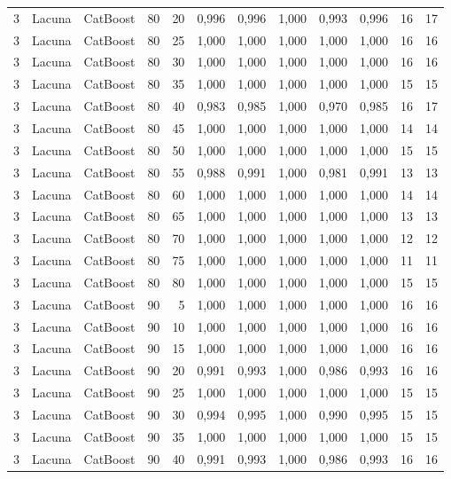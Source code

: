 \begin{longtable}{@{}rllrrrrrrrrr@{}}
3 & Lacuna & CatBoost & 80 & 20 & 0,996 & 0,996 & 1,000 & 0,993 & 0,996 & 16 & 17 \\
3 & Lacuna & CatBoost & 80 & 25 & 1,000 & 1,000 & 1,000 & 1,000 & 1,000 & 16 & 16 \\
3 & Lacuna & CatBoost & 80 & 30 & 1,000 & 1,000 & 1,000 & 1,000 & 1,000 & 16 & 16 \\
3 & Lacuna & CatBoost & 80 & 35 & 1,000 & 1,000 & 1,000 & 1,000 & 1,000 & 15 & 15 \\
3 & Lacuna & CatBoost & 80 & 40 & 0,983 & 0,985 & 1,000 & 0,970 & 0,985 & 16 & 17 \\
3 & Lacuna & CatBoost & 80 & 45 & 1,000 & 1,000 & 1,000 & 1,000 & 1,000 & 14 & 14 \\
3 & Lacuna & CatBoost & 80 & 50 & 1,000 & 1,000 & 1,000 & 1,000 & 1,000 & 15 & 15 \\
3 & Lacuna & CatBoost & 80 & 55 & 0,988 & 0,991 & 1,000 & 0,981 & 0,991 & 13 & 13 \\
3 & Lacuna & CatBoost & 80 & 60 & 1,000 & 1,000 & 1,000 & 1,000 & 1,000 & 14 & 14 \\
3 & Lacuna & CatBoost & 80 & 65 & 1,000 & 1,000 & 1,000 & 1,000 & 1,000 & 13 & 13 \\
3 & Lacuna & CatBoost & 80 & 70 & 1,000 & 1,000 & 1,000 & 1,000 & 1,000 & 12 & 12 \\
3 & Lacuna & CatBoost & 80 & 75 & 1,000 & 1,000 & 1,000 & 1,000 & 1,000 & 11 & 11 \\
3 & Lacuna & CatBoost & 80 & 80 & 1,000 & 1,000 & 1,000 & 1,000 & 1,000 & 15 & 15 \\
3 & Lacuna & CatBoost & 90 & 5 & 1,000 & 1,000 & 1,000 & 1,000 & 1,000 & 16 & 16 \\
3 & Lacuna & CatBoost & 90 & 10 & 1,000 & 1,000 & 1,000 & 1,000 & 1,000 & 16 & 16 \\
3 & Lacuna & CatBoost & 90 & 15 & 1,000 & 1,000 & 1,000 & 1,000 & 1,000 & 16 & 16 \\
3 & Lacuna & CatBoost & 90 & 20 & 0,991 & 0,993 & 1,000 & 0,986 & 0,993 & 16 & 16 \\
3 & Lacuna & CatBoost & 90 & 25 & 1,000 & 1,000 & 1,000 & 1,000 & 1,000 & 15 & 15 \\
3 & Lacuna & CatBoost & 90 & 30 & 0,994 & 0,995 & 1,000 & 0,990 & 0,995 & 15 & 15 \\
3 & Lacuna & CatBoost & 90 & 35 & 1,000 & 1,000 & 1,000 & 1,000 & 1,000 & 15 & 15 \\
3 & Lacuna & CatBoost & 90 & 40 & 0,991 & 0,993 & 1,000 & 0,986 & 0,993 & 16 & 16 \\

\end{longtable}
